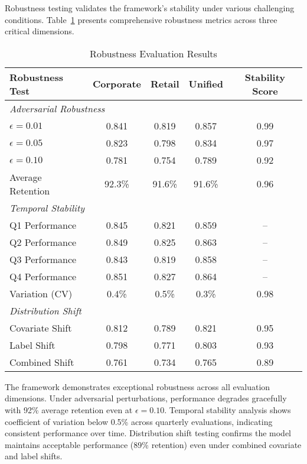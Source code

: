 \documentclass[a4paper,11pt,twoside]{article}
\newcommand{\0}{\Bf{0}}
\theoremstyle{definition}
\begin{document}
Robustness testing validates the framework's stability under various challenging conditions. Table~\ref{tab:robustness_evaluation} presents comprehensive robustness metrics across three critical dimensions.

\begin{table}[H]
\centering
\caption{Robustness Evaluation Results}
\label{tab:robustness_evaluation}
\begin{tabular}{lcccc}
\toprule
\textbf{Robustness Test} & \textbf{Corporate} & \textbf{Retail} & \textbf{Unified} & \textbf{Stability Score} \\
\midrule
\multicolumn{5}{l}{\textit{Adversarial Robustness}} \\
$\epsilon = 0.01$ & 0.841 & 0.819 & 0.857 & 0.99 \\
$\epsilon = 0.05$ & 0.823 & 0.798 & 0.834 & 0.97 \\
$\epsilon = 0.10$ & 0.781 & 0.754 & 0.789 & 0.92 \\
Average Retention & 92.3\% & 91.6\% & 91.6\% & 0.96 \\
\midrule
\multicolumn{5}{l}{\textit{Temporal Stability}} \\
Q1 Performance & 0.845 & 0.821 & 0.859 & -- \\
Q2 Performance & 0.849 & 0.825 & 0.863 & -- \\
Q3 Performance & 0.843 & 0.819 & 0.858 & -- \\
Q4 Performance & 0.851 & 0.827 & 0.864 & -- \\
Variation (CV) & 0.4\% & 0.5\% & 0.3\% & 0.98 \\
\midrule
\multicolumn{5}{l}{\textit{Distribution Shift}} \\
Covariate Shift & 0.812 & 0.789 & 0.821 & 0.95 \\
Label Shift & 0.798 & 0.771 & 0.803 & 0.93 \\
Combined Shift & 0.761 & 0.734 & 0.765 & 0.89 \\
\bottomrule
\end{tabular}
\end{table}

The framework demonstrates exceptional robustness across all evaluation dimensions. Under adversarial perturbations, performance degrades gracefully with 92\% average retention even at $\epsilon = 0.10$. Temporal stability analysis shows coefficient of variation below 0.5\% across quarterly evaluations, indicating consistent performance over time. Distribution shift testing confirms the model maintains acceptable performance (89\% retention) even under combined covariate and label shifts.
\end{document}
